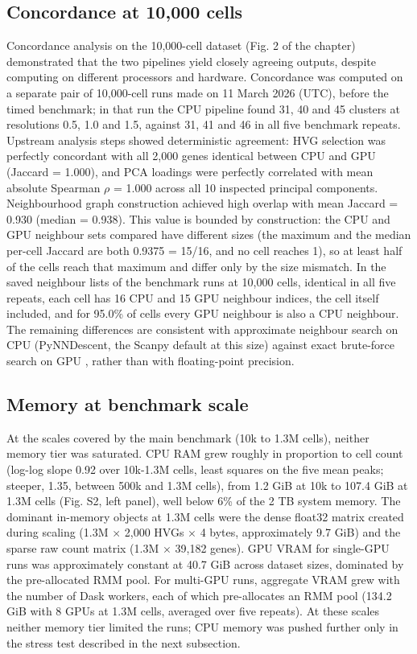 \documentclass[runningheads]{llncs}
\begin{document}
\hypertarget{concordance-at-10000-cells}{%
\subsection{Concordance at 10,000 cells}\label{concordance-at-10000-cells}}

Concordance analysis on the 10,000-cell dataset (Fig. 2 of the chapter) demonstrated that the two pipelines yield closely agreeing outputs, despite computing on different processors and hardware. Concordance was computed on a separate pair of 10,000-cell runs made on 11 March 2026 (UTC), before the timed benchmark; in that run the CPU pipeline found 31, 40 and 45 clusters at resolutions 0.5, 1.0 and 1.5, against 31, 41 and 46 in all five benchmark repeats. Upstream analysis steps showed deterministic agreement: HVG selection was perfectly concordant with all 2,000 genes identical between CPU and GPU (Jaccard = 1.000), and PCA loadings were perfectly correlated with mean absolute Spearman $\rho$ = 1.000 across all 10 inspected principal components. Neighbourhood graph construction achieved high overlap with mean Jaccard = 0.930 (median = 0.938). This value is bounded by construction: the CPU and GPU neighbour sets compared have different sizes (the maximum and the median per-cell Jaccard are both 0.9375 = 15/16, and no cell reaches 1), so at least half of the cells reach that maximum and differ only by the size mismatch. In the saved neighbour lists of the benchmark runs at 10,000 cells, identical in all five repeats, each cell has 16 CPU and 15 GPU neighbour indices, the cell itself included, and for 95.0\% of cells every GPU neighbour is also a CPU neighbour. The remaining differences are consistent with approximate neighbour search on CPU (PyNNDescent, the Scanpy default at this size) against exact brute-force search on GPU \cite{Gardner2025}, rather than with floating-point precision.

\hypertarget{memory-at-benchmark-scale}{%
\subsection{Memory at benchmark scale}\label{memory-at-benchmark-scale}}

At the scales covered by the main benchmark (10k to 1.3M cells), neither memory tier was saturated. CPU RAM grew roughly in proportion to cell count (log-log slope 0.92 over 10k-1.3M cells, least squares on the five mean peaks; steeper, 1.35, between 500k and 1.3M cells), from 1.2 GiB at 10k to 107.4 GiB at 1.3M cells (Fig. S2, left panel), well below 6\% of the 2 TB system memory. The dominant in-memory objects at 1.3M cells were the dense float32 matrix created during scaling (1.3M $\times$ 2,000 HVGs $\times$ 4 bytes, approximately 9.7 GiB) and the sparse raw count matrix (1.3M $\times$ 39,182 genes). GPU VRAM for single-GPU runs was approximately constant at 40.7 GiB across dataset sizes, dominated by the pre-allocated RMM pool. For multi-GPU runs, aggregate VRAM grew with the number of Dask workers, each of which pre-allocates an RMM pool (134.2 GiB with 8 GPUs at 1.3M cells, averaged over five repeats). At these scales neither memory tier limited the runs; CPU memory was pushed further only in the stress test described in the next subsection.
\end{document}
